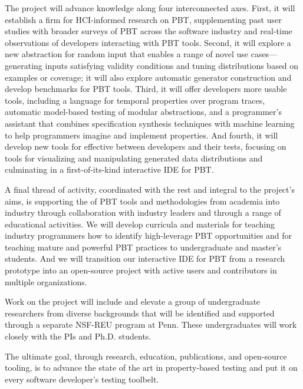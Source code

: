 The project will advance knowledge along four
interconnected axes.
%
First, it will establish a firm  for HCI-informed
research on PBT, supplementing past user studies with
broader surveys of PBT across the software industry and real-time
observations of developers interacting with PBT tools.
%
Second, it will explore a new abstraction for random input
 that enables a range of novel use
cases---generating inputs satisfying validity conditions and tuning
distributions based on examples or coverage; it
will also explore automatic generator construction and develop
benchmarks for PBT tools.
%
Third, it will offer developers more usable  tools,
including a language for temporal properties over program traces,
automatic model-based testing of
modular abstractions, and a programmer's assistant that combines
specification synthesis techniques with machine learning
to help programmers imagine and implement properties.
%
And fourth, it will develop new tools for effective
 between developers and their tests, focusing on
tools for visualizing and manipulating generated data
distributions and culminating in a first-of-its-kind interactive IDE for PBT.

A final thread of activity, coordinated with the rest and integral to the
project's aims,
is supporting the  of PBT tools and
methodologies from academia into industry through collaboration with
industry leaders and through a range of educational activities.
We will
develop curricula and materials for teaching industry programmers how
to identify
high-leverage PBT opportunities and for teaching mature
and powerful PBT practices to undergraduate and master's students.
And we will transition our interactive IDE for PBT from a research
prototype into an open-source project with active users and
contributors in multiple organizations.

Work on the project will include and elevate a group of undergraduate
researchers from
diverse backgrounds that will be identified and supported through
a separate NSF-REU program at Penn. These
undergraduates will work closely with the PIs and Ph.D.{} students.


\smallskip

The ultimate goal, through research, education, publications, and open-source
tooling, is to advance the state of the art in property-based testing
and put it on every
software developer's testing toolbelt.

